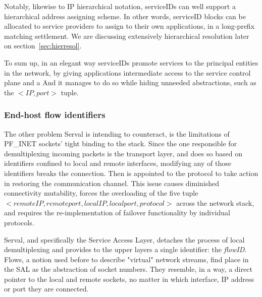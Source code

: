 Notably, likewise to IP hierarchical notation, serviceIDs can well support a hierarchical address assigning scheme.
In other words, serviceID blocks can be allocated to service providers to assign to their own applications, in a long-prefix matching settlement.
We are discussing extensively hierarchical resolution later on section~\ref{sec:hierresol}.

To sum up, in an elegant way serviceIDs promote services to the principal entities in the network, by giving applications intermediate access to the service control plane and a
And it manages to do so while hiding unneeded abstractions, such as the $<IP, port>$ tuple.



\subsubsection{End-host flow identifiers}
The other problem Serval is intending to counteract, is the limitations of PF\_INET sockets' tight binding to the stack.
Since the one responsible for demultiplexing incoming packets is the transport layer, and does so based on identifiers confined to local and remote interfaces, modifying any of those identifiers breaks the connection.
Then is appointed to the protocol to take action in restoring the communication channel.
This issue causes diminished connectivity mutability, forces the overloading of the five tuple $<remote IP, remote port, local IP, local port, protocol>$ across the network stack, and requires the re-implementation of failover functionality by individual protocols.

Serval, and specifically the Service Access Layer, detaches the process of local demultiplexing and provides to the upper layers a single identifier: the \emph{flowID}.
Flows, a notion used before to describe "virtual" network streams, find place in the SAL as the abstraction of socket numbers.
They resemble, in a way, a direct pointer to the local and remote sockets, no matter in which interface, IP address or port they are connected.

